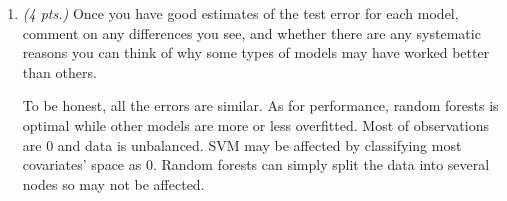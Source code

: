 \documentclass[11pt,english]{article}
\begin{document}
\begin{enumerate}
\item \textit{(4 pts.)} Once you have good estimates of the test error for each model, comment on any differences you see, and whether there are any systematic reasons you can think of why some types of models may have worked better than others.\par

To be honest, all the errors are similar.  As for performance, random forests is optimal while other models are more or less overfitted.  Most of observations are 0 and data is unbalanced. SVM may be affected by classifying most covariates' space as 0. Random forests can simply split the data into several nodes so may not be affected.
\end{enumerate}
\end{document}
